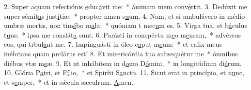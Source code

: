 2. Super aquam refectiónis \uline{e}duc\uline{á}vit me:~* ánimam mem conv\uline{é}rtit.
3. Dedúxit me super sémit\uline{a}s just\uline{í}tiæ:~* propter nmen s\uline{u}um.
4. Nam, et si ambulávero in médio umbræ mortis, non tim\uline{é}bo m\uline{a}la:~* quóniam t mec\uline{u}m es.
5. Virga tua, et b\uline{á}culus t\uline{u}us:~* ipsa me conslát\uline{a} sunt.
6. Parásti in conspéctu m\uline{e}o m\uline{e}nsam,~* advérsus eos, qui trbul\uline{a}nt me.
7. Impinguásti in óleo c\uline{a}put m\uline{e}um:~* et calix meus inébrians quam prclár\uline{u}s est!
8. Et misericórdia tua s\uline{u}bse\uline{qué}tur me~* ómnibus diébus vtæ m\uline{e}æ.
9. Et ut inhábitem in d\uline{o}mo D\uline{ó}mini,~* in longitúdinm di\uline{é}rum.
10. Glória P\uline{a}tri, et F\uline{í}lio,~* et Spiríti S\uline{a}ncto.
11. Sicut erat in princípio, et n\uline{u}nc, et s\uline{e}mper,~* et in sǽcula sæculrum. \uline{A}men.
